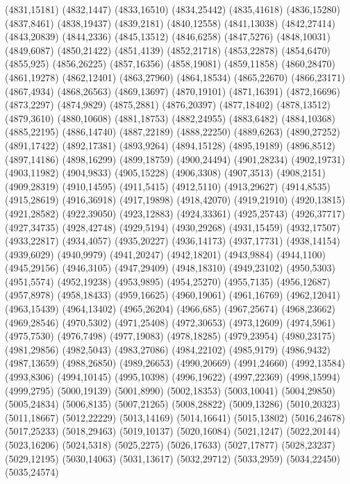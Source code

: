 (4831,15181)
(4832,1447)
(4833,16510)
(4834,25442)
(4835,41618)
(4836,15280)
(4837,8461)
(4838,19437)
(4839,2181)
(4840,12558)
(4841,13038)
(4842,27414)
(4843,20839)
(4844,2336)
(4845,13512)
(4846,6258)
(4847,5276)
(4848,10031)
(4849,6087)
(4850,21422)
(4851,4139)
(4852,21718)
(4853,22878)
(4854,6470)
(4855,925)
(4856,26225)
(4857,16356)
(4858,19081)
(4859,11858)
(4860,28470)
(4861,19278)
(4862,12401)
(4863,27960)
(4864,18534)
(4865,22670)
(4866,23171)
(4867,4934)
(4868,26563)
(4869,13697)
(4870,19101)
(4871,16391)
(4872,16696)
(4873,2297)
(4874,9829)
(4875,2881)
(4876,20397)
(4877,18402)
(4878,13512)
(4879,3610)
(4880,10608)
(4881,18753)
(4882,24955)
(4883,6482)
(4884,10368)
(4885,22195)
(4886,14740)
(4887,22189)
(4888,22250)
(4889,6263)
(4890,27252)
(4891,17422)
(4892,17381)
(4893,9264)
(4894,15128)
(4895,19189)
(4896,8512)
(4897,14186)
(4898,16299)
(4899,18759)
(4900,24494)
(4901,28234)
(4902,19731)
(4903,11982)
(4904,9833)
(4905,15228)
(4906,3308)
(4907,3513)
(4908,2151)
(4909,28319)
(4910,14595)
(4911,5415)
(4912,5110)
(4913,29627)
(4914,8535)
(4915,28619)
(4916,36918)
(4917,19898)
(4918,42070)
(4919,21910)
(4920,13815)
(4921,28582)
(4922,39050)
(4923,12883)
(4924,33361)
(4925,25743)
(4926,37717)
(4927,34735)
(4928,42748)
(4929,5194)
(4930,29268)
(4931,15459)
(4932,17507)
(4933,22817)
(4934,4057)
(4935,20227)
(4936,14173)
(4937,17731)
(4938,14154)
(4939,6029)
(4940,9979)
(4941,20247)
(4942,18201)
(4943,9884)
(4944,1100)
(4945,29156)
(4946,3105)
(4947,29409)
(4948,18310)
(4949,23102)
(4950,5303)
(4951,5574)
(4952,19238)
(4953,9895)
(4954,25270)
(4955,7135)
(4956,12687)
(4957,8978)
(4958,18433)
(4959,16625)
(4960,19061)
(4961,16769)
(4962,12041)
(4963,15439)
(4964,13402)
(4965,26204)
(4966,685)
(4967,25674)
(4968,23662)
(4969,28546)
(4970,5302)
(4971,25408)
(4972,30653)
(4973,12609)
(4974,5961)
(4975,7530)
(4976,7498)
(4977,19083)
(4978,18285)
(4979,23954)
(4980,23175)
(4981,29856)
(4982,5043)
(4983,27086)
(4984,22102)
(4985,9179)
(4986,9432)
(4987,13659)
(4988,26850)
(4989,26653)
(4990,20669)
(4991,24660)
(4992,13584)
(4993,8306)
(4994,10145)
(4995,10398)
(4996,19622)
(4997,22369)
(4998,15994)
(4999,2795)
(5000,19139)
(5001,8990)
(5002,18353)
(5003,10041)
(5004,29850)
(5005,24834)
(5006,8135)
(5007,21265)
(5008,28822)
(5009,13286)
(5010,20323)
(5011,18667)
(5012,22229)
(5013,14169)
(5014,16641)
(5015,13802)
(5016,24678)
(5017,25233)
(5018,29463)
(5019,10137)
(5020,16084)
(5021,1247)
(5022,20144)
(5023,16206)
(5024,5318)
(5025,2275)
(5026,17633)
(5027,17877)
(5028,23237)
(5029,12195)
(5030,14063)
(5031,13617)
(5032,29712)
(5033,2959)
(5034,22450)
(5035,24574)
